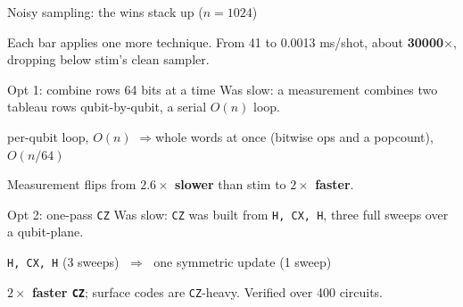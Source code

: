 \documentclass[aspectratio=169]{beamer}
\newcommand{\code}[1]{\texttt{#1}}
\begin{document}
\begin{frame}{Noisy sampling: the wins stack up ($n=1024$)}
  \centering
  \par\footnotesize Each bar applies one more technique. From 41 to 0.0013 ms/shot, about \textbf{30000$\times$}, dropping below stim's clean sampler.
\end{frame}

\begin{frame}{Opt 1: combine rows 64 bits at a time}
  \alert{Was slow:} a measurement combines two tableau rows qubit-by-qubit, a serial $O(n)$ loop.
  \vfill
  \begin{center}\large
    per-qubit loop, $O(n)$ \quad$\Longrightarrow$\quad whole words at once (bitwise ops and a popcount), $O(n/64)$
  \end{center}
  \vfill
  \begin{center}\large Measurement flips from \textbf{$2.6\times$ slower} than stim to \textbf{$2\times$ faster}.\end{center}
\end{frame}

\begin{frame}{Opt 2: one-pass \code{CZ}}
  \alert{Was slow:} \code{CZ} was built from \code{H, CX, H}, three full sweeps over a qubit-plane.
  \vfill
  \begin{center}\large \code{H, CX, H} (3 sweeps) $\;\Longrightarrow\;$ one symmetric update (1 sweep)\end{center}
  \vfill
  \begin{center}\large \textbf{$2\times$ faster \code{CZ}}; surface codes are \code{CZ}-heavy. Verified over 400 circuits.\end{center}
\end{frame}
\end{document}
